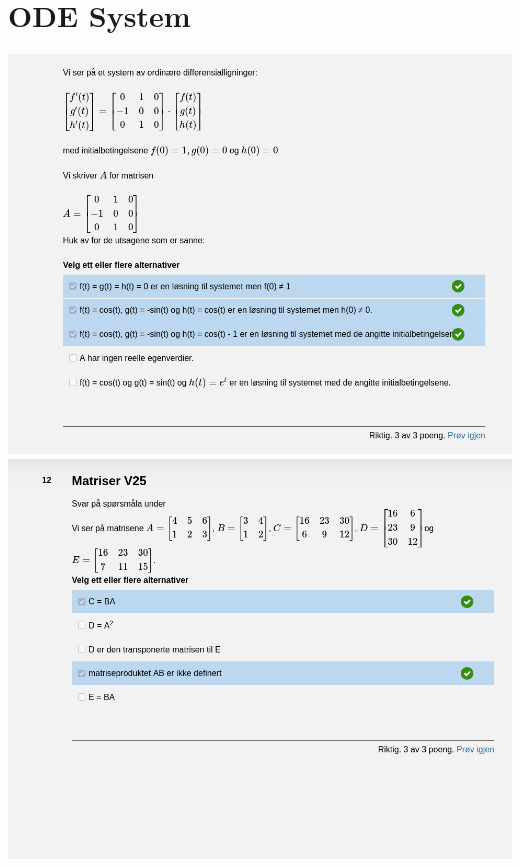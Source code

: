 \documentclass[12pt]{article}
\begin{document}
\section*{ODE System}
\includegraphics[width=\textwidth]{Screenshot_20250521_135604.png}
\newpage
\includegraphics[width=\textwidth]{Screenshot_20250521_135703.png}
\newpage
\end{document}
